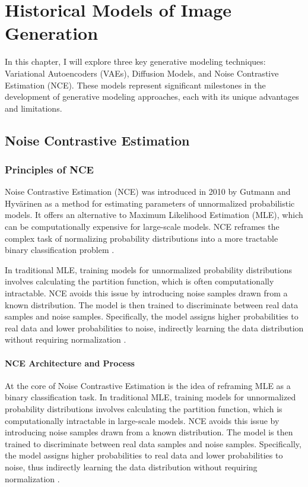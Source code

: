 \chapter{Historical Models of Image Generation}

In this chapter, I will explore three key generative modeling techniques: Variational Autoencoders (VAEs), Diffusion Models, and Noise Contrastive Estimation (NCE). These models represent significant milestones in the development of generative modeling approaches, each with its unique advantages and limitations. 

\section{Noise Contrastive Estimation}

\subsection{Principles of NCE}

Noise Contrastive Estimation (NCE) was introduced in 2010 by Gutmann and Hyvärinen as a method for estimating parameters of unnormalized probabilistic models. It offers an alternative to Maximum Likelihood Estimation (MLE), which can be computationally expensive for large-scale models. NCE reframes the complex task of normalizing probability distributions into a more tractable binary classification problem \citep{10.48550/arxiv.1711.00658}.

In traditional MLE, training models for unnormalized probability distributions involves calculating the partition function, which is often computationally intractable. NCE avoids this issue by introducing noise samples drawn from a known distribution. The model is then trained to discriminate between real data samples and noise samples. Specifically, the model assigns higher probabilities to real data and lower probabilities to noise, indirectly learning the data distribution without requiring normalization \citep{10.48550/arxiv.2110.11271}.

\subsubsection{NCE Architecture and Process}

At the core of Noise Contrastive Estimation is the idea of reframing MLE as a binary classification task. In traditional MLE, training models for unnormalized probability distributions involves calculating the partition function, which is computationally intractable in large-scale models. NCE avoids this issue by introducing noise samples drawn from a known distribution. The model is then trained to discriminate between real data samples and noise samples. Specifically, the model assigns higher probabilities to real data and lower probabilities to noise, thus indirectly learning the data distribution without requiring normalization \citep{10.48550/arxiv.2110.11271}.

